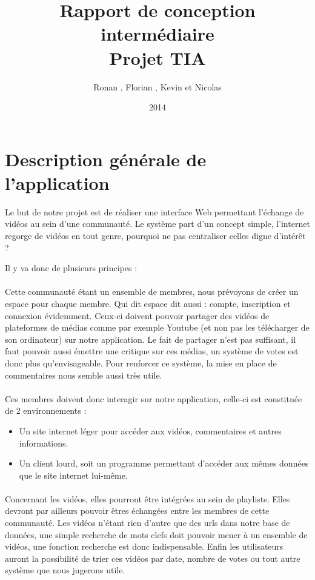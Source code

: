 \documentclass{article}
\title{Rapport de conception intermédiaire\\
Projet TIA}
\author{Ronan \bsc{Abhamon}, Florian \bsc{Bigard}, Kevin \bsc{Hivert} et Nicolas \bsc{Reynaud}}
\date{2014}
\begin{document}
\maketitle

\newpage

\renewcommand{\contentsname}{Sommaire}
\tableofcontents
\newpage

\section{Description générale de l'application}

Le but de notre projet est de réaliser une interface Web permettant l'échange de vidéos au sein d'une communauté.
Le système part d'un concept simple, l'internet regorge de vidéos en tout genre, pourquoi ne pas centraliser celles digne d'intérêt ?

Il y va donc de plusieurs principes :

\paragraph{}
Cette communauté étant un ensemble de membres, nous prévoyons de créer un espace pour chaque membre. Qui dit espace dit aussi : 
compte, inscription et connexion évidemment. Ceux-ci doivent pouvoir partager des vidéos de plateformes de médias comme par exemple Youtube
(et non pas les télécharger de son ordinateur) sur notre application.
Le fait de partager n'est pas suffisant, il faut pouvoir aussi émettre une critique sur ces médias, un système de votes est donc plus
qu'envisageable. Pour renforcer ce système, la mise en place de commentaires nous semble aussi très utile. 

\paragraph{}
Ces membres doivent donc interagir sur notre application, celle-ci est constituée de 2 environnements :
\begin{itemize}
	\item Un site internet léger pour accéder aux vidéos, commentaires et autres informations.
	\item Un client lourd, soit un programme permettant d'accéder aux mêmes données que le site internet lui-même.
\end{itemize}

\paragraph{} Concernant les vidéos, elles pourront être intégrées au sein de playlists. Elles devront par ailleurs pouvoir êtres 
échangées entre les membres de cette communauté. Les vidéos n'étant rien d'autre que des urls dans notre base de données, une simple
recherche de mots clefs doit pouvoir mener à un ensemble de vidéos, une fonction recherche est donc indispensable. Enfin les utilisateurs
auront la possibilité de trier ces vidéos par date, nombre de votes ou tout autre système que nous jugerons utile.
\end{document}
